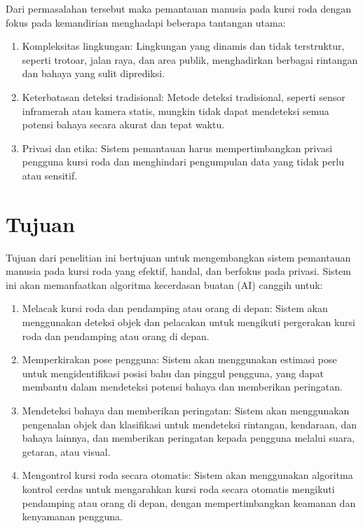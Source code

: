 Dari permasalahan tersebut maka pemantauan manusia pada kursi roda dengan fokus pada kemandirian menghadapi beberapa tantangan utama:

\begin{enumerate}[nolistsep]

      \item Kompleksitas lingkungan: Lingkungan yang dinamis dan tidak terstruktur, seperti trotoar, jalan raya, dan area publik, menghadirkan berbagai rintangan dan bahaya yang sulit diprediksi.

      \item Keterbatasan deteksi tradisional: Metode deteksi tradisional, seperti sensor inframerah atau kamera statis, mungkin tidak dapat mendeteksi semua potensi bahaya secara akurat dan tepat waktu.

      \item Privasi dan etika: Sistem pemantauan harus mempertimbangkan privasi pengguna kursi roda dan menghindari pengumpulan data yang tidak perlu atau sensitif.

\end{enumerate}
\newpage

\section{Tujuan}
\label{sec:Tujuan}

Tujuan dari penelitian ini bertujuan untuk mengembangkan sistem pemantauan manusia pada kursi roda yang efektif, handal, dan berfokus pada privasi. Sistem ini akan memanfaatkan algoritma kecerdasan buatan (AI) canggih untuk:

\begin{enumerate}[nolistsep]

      \item Melacak kursi roda dan pendamping atau orang di depan: Sistem akan menggunakan deteksi objek dan pelacakan untuk mengikuti pergerakan kursi roda dan pendamping atau orang di depan.

      \item Memperkirakan pose pengguna: Sistem akan menggunakan estimasi pose untuk mengidentifikasi posisi bahu dan pinggul pengguna, yang dapat membantu dalam mendeteksi potensi bahaya dan memberikan peringatan.

      \item Mendeteksi bahaya dan memberikan peringatan: Sistem akan menggunakan pengenalan objek dan klasifikasi untuk mendeteksi rintangan, kendaraan, dan bahaya lainnya, dan memberikan peringatan kepada pengguna melalui suara, getaran, atau visual.

      \item Mengontrol kursi roda secara otomatis: Sistem akan menggunakan algoritma kontrol cerdas untuk mengarahkan kursi roda secara otomatis mengikuti pendamping atau orang di depan, dengan mempertimbangkan keamanan dan kenyamanan pengguna.

\end{enumerate}

